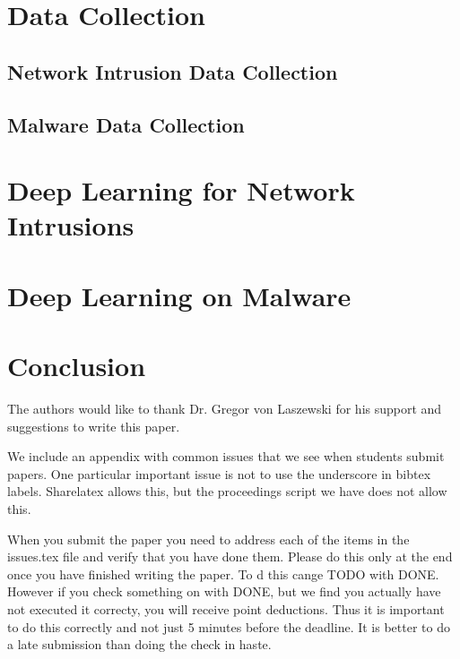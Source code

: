 \documentclass[sigconf]{acmart}
\begin{document}
\section{Data Collection}
\subsection{Network Intrusion Data Collection}
\subsection{Malware Data Collection}


\section{Deep Learning for Network Intrusions}




\section{Deep Learning on Malware}



\section{Conclusion}




\begin{acks}

  The authors would like to thank Dr. Gregor von Laszewski for his
  support and suggestions to write this paper.

\end{acks}


 

\appendix

We include an appendix with common issues that we see when students
submit papers. One particular important issue is not to use the
underscore in bibtex labels. Sharelatex allows this, but the
proceedings script we have does not allow this.

When you submit the paper you need to address each of the items in the
issues.tex file and verify that you have done them. Please do this
only at the end once you have finished writing the paper. To d this
cange TODO with DONE. However if you check something on with DONE, but
we find you actually have not executed it correcty, you will receive
point deductions. Thus it is important to do this correctly and not
just 5 minutes before the deadline. It is better to do a late
submission than doing the check in haste. 


\end{document}
